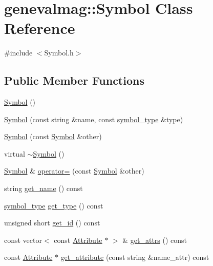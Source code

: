 \hypertarget{classgenevalmag_1_1Symbol}{
\section{genevalmag::Symbol Class Reference}
\label{classgenevalmag_1_1Symbol}
}


{\ttfamily \#include $<$Symbol.h$>$}

\subsection*{Public Member Functions}
\begin{DoxyCompactItemize}
\item 
\hyperlink{classgenevalmag_1_1Symbol_a52c72b2631eb77cec685aae2bd61ab4d}{Symbol} ()
\item 
\hyperlink{classgenevalmag_1_1Symbol_a2b522913fae452ad9c5a32587a122450}{Symbol} (const string \&name, const \hyperlink{namespacegenevalmag_a4c1cf205cb145b09e46df5277bcc70c6}{symbol\_\-type} \&type)
\item 
\hyperlink{classgenevalmag_1_1Symbol_a16cbf4081db9ad6ba822270ede78cfb6}{Symbol} (const \hyperlink{classgenevalmag_1_1Symbol}{Symbol} \&other)
\item 
virtual \hyperlink{classgenevalmag_1_1Symbol_a0701e9b520243d48a2c2a34f5d105194}{$\sim$Symbol} ()
\item 
\hyperlink{classgenevalmag_1_1Symbol}{Symbol} \& \hyperlink{classgenevalmag_1_1Symbol_a4f51c5b39b2a272210fc7a15d07bdd4e}{operator=} (const \hyperlink{classgenevalmag_1_1Symbol}{Symbol} \&other)
\item 
string \hyperlink{classgenevalmag_1_1Symbol_afcd9c46fe546ec9f1b62caeb99377917}{get\_\-name} () const 
\item 
\hyperlink{namespacegenevalmag_a4c1cf205cb145b09e46df5277bcc70c6}{symbol\_\-type} \hyperlink{classgenevalmag_1_1Symbol_afc8f4add5f5fd5c93b469f18392e932d}{get\_\-type} () const 
\item 
unsigned short \hyperlink{classgenevalmag_1_1Symbol_ae9a6e2cd92092a417cf0ba9993792303}{get\_\-id} () const 
\item 
const vector$<$ const \hyperlink{classgenevalmag_1_1Attribute}{Attribute} $\ast$ $>$ \& \hyperlink{classgenevalmag_1_1Symbol_a2691d14dc2083bb95c5c18017ad76c21}{get\_\-attrs} () const 
\item 
const \hyperlink{classgenevalmag_1_1Attribute}{Attribute} $\ast$ \hyperlink{classgenevalmag_1_1Symbol_a58f45135b17a802eb9e124d91875204b}{get\_\-attribute} (const string \&name\_\-attr) const 

\end{DoxyCompactItemize}
